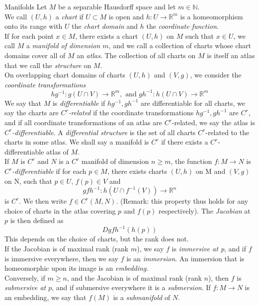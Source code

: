 \documentclass[11pt, a4paper]{memoir}
\theoremstyle{break}
\theoremstyle{break}
\theoremstyle{nonumberplain}
\newcommand{\mN}{\mathbb{N}}
\newcommand{\mR}{\mathbb{R}}
\begin{document}
\begin{mydefinition}{Manifolds}
Let $M$ be a separable Hausdorff space and let $m\in \mN$.\\[5pt]
We call $(U,h)$ a \emph{chart} if $U\subset M$ is open and $h: U\to \mR^m$ is a homeomorphism onto its range with $U$ the \emph{chart domain} and $h$ the \emph{coordinate function}.\\[5pt]
If for each point $x\in M$, there exists a chart $(U,h)$ on $M$ such that $x\in U$, we call $M$ a \emph{manifold of dimension $m$}, and we call a collection of charts whose chart domains cover all of $M$ an \emph{atlas}. The collection of all charts on $M$ is itself an atlas that we call the \emph{structure} on $M$.\\[5pt]
On overlapping chart domains of charts $(U,h)$ and $(V,g)$, we consider the \emph{coordinate transformations}
$$hg^{-1}: g(U\cap V)\to \mR^m, \text{ and } gh^{-1}: h(U\cap V)\to \mR^m$$
We say that $M$ is \emph{differentiable} if $hg^{-1}, gh^{-1}$ are differentiable for all charts, we say the charts are \emph{$C^r$-related} if the coordinate transformations $hg^{-1}, gh^{-1}$ are $C^r$, and if all coordinate transformations of an atlas are $C^r$-related, we say the atlas is \emph{$C^r$-differentiable}. A \emph{differential structure} is the set of all charts $C^r$-related to the charts in some atlas. We shall say a manifold is $C^r$ if there exists a $C^r$-differentiable atlas of $M$.\\[5pt]
If $M$ is $C^r$ and $N$ is a $C^r$ manifold of dimension $n\geqslant m$, the function $f: M\to N$ is \emph{$C^r$-differentiable} if for each $p\in M$, there exists charts $(U,h)$ on M and $(V,g)$ on N, such that $p\in U$, $f(p)\in V$ and 
$$gfh^{-1}: h(U\cap f^{-1}(V))\to \mR^n$$
is $C^r$. We then write $f\in C^r(M,N)$. (Remark: this property thus holds for any choice of charts in the atlas covering $p$ and $f(p)$ respectively). The \emph{Jacobian} at $p$ is then defined as 
$$Dgfh^{-1}(h(p))$$
This depends on the choice of charts, but the rank does not.\\[5pt]
If the Jacobian is of maximal rank (rank $m$), we say $f$ is \emph{immersive at p}, and if $f$ is immersive everywhere, then we say $f$ is an \emph{immersion}. An immersion that is homeomorphic upon its image is an \emph{embedding}.\\[5pt]
Conversely, if $m\geqslant n$, and the Jacobian is of maximal rank (rank $n$), then $f$ is \emph{submersive at $p$}, and if submersive everywhere it is a \emph{submersion}. If $f: M\to N$ is an embedding, we say that $f(M)$ is a \emph{submanifold} of $N$.\\[5pt]

\end{mydefinition}
\end{document}
